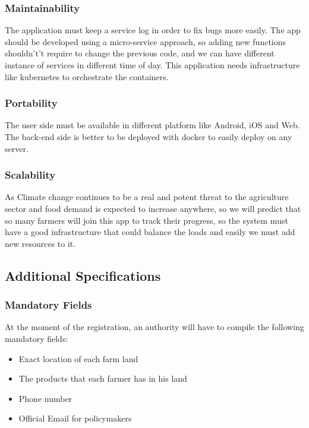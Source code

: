     \subsubsection{Maintainability}
    The application must keep a service log in order to fix bugs more easily. The app should be developed using a micro-service approach, so adding new functions shouldn't’t require to change the previous code, and we can have different instance of services in different time of day. This application needs infrastructure like kubernetes to orchestrate the containers.
    \subsubsection{Portability}
    The user side must be available in different platform like Android, iOS and Web. The back-end side is better to be deployed with docker to easily deploy on any server.
    \subsubsection{Scalability}
    As Climate change continues to be a real and potent threat to the agriculture sector and food demand is expected to increase anywhere, so we will predict that so many farmers will join this app to track their progress, so the system must have a good infrastructure that could balance the loads and easily we must add new resources to it.
\subsection{Additional Specifications}
    \subsubsection{Mandatory Fields}
    At the moment of the registration, an authority will have to compile the following mandatory fields:
    \begin{itemize}
        \item Exact location of each farm land
        \item The products that each farmer has in his land
        \item Phone number
        \item Official Email for policymakers
    \end{itemize}

    \clearpage


